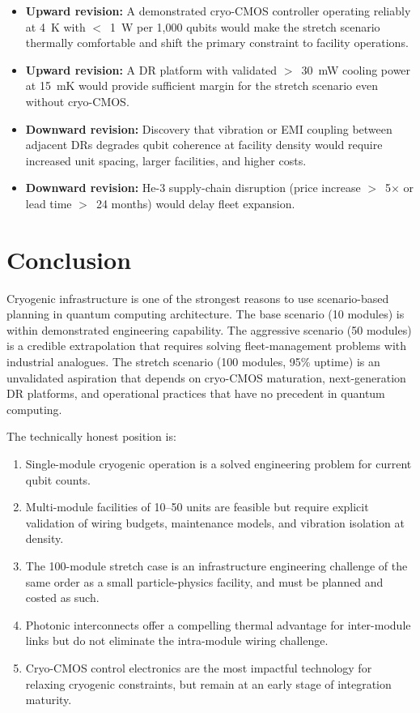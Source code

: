 \documentclass[conference]{IEEEtran}
\begin{document}
\begin{itemize}
\item \textbf{Upward revision:} A demonstrated cryo-CMOS controller operating reliably at 4~K with $<$~1~W per 1,000 qubits would make the stretch scenario thermally comfortable and shift the primary constraint to facility operations.
\item \textbf{Upward revision:} A DR platform with validated $>$~30~mW cooling power at 15~mK would provide sufficient margin for the stretch scenario even without cryo-CMOS.
\item \textbf{Downward revision:} Discovery that vibration or EMI coupling between adjacent DRs degrades qubit coherence at facility density would require increased unit spacing, larger facilities, and higher costs.
\item \textbf{Downward revision:} He-3 supply-chain disruption (price increase $>$~5$\times$ or lead time $>$~24 months) would delay fleet expansion.
\end{itemize}

\section{Conclusion}

Cryogenic infrastructure is one of the strongest reasons to use scenario-based planning in quantum computing architecture. The base scenario (10 modules) is within demonstrated engineering capability. The aggressive scenario (50 modules) is a credible extrapolation that requires solving fleet-management problems with industrial analogues. The stretch scenario (100 modules, 95\% uptime) is an unvalidated aspiration that depends on cryo-CMOS maturation, next-generation DR platforms, and operational practices that have no precedent in quantum computing.

The technically honest position is:

\begin{enumerate}
\item Single-module cryogenic operation is a solved engineering problem for current qubit counts.
\item Multi-module facilities of 10--50 units are feasible but require explicit validation of wiring budgets, maintenance models, and vibration isolation at density.
\item The 100-module stretch case is an infrastructure engineering challenge of the same order as a small particle-physics facility, and must be planned and costed as such.
\item Photonic interconnects offer a compelling thermal advantage for inter-module links but do not eliminate the intra-module wiring challenge.
\item Cryo-CMOS control electronics are the most impactful technology for relaxing cryogenic constraints, but remain at an early stage of integration maturity.
\end{enumerate}
\end{document}
